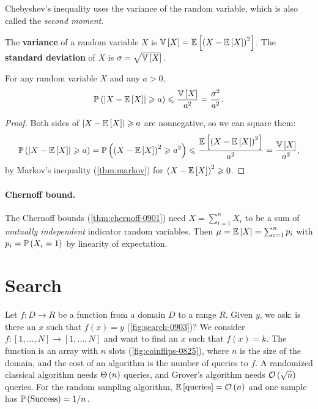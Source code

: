 Chebyshev's inequality uses the variance of the random variable, which is also called the
\emph{second moment}.

\begin{definition}
    The \textbf{variance} of a random variable $X$ is
    $\variance{X} = \expectation{\left(X - \expectation{X}\right)^2}$.
    The \textbf{standard deviation} of $X$ is $\sigma = \sqrt{\operatorname{\mathbb{V}}\left[X\right]}$.
\end{definition}

\begin{theorem}\label{thm:chebyshev}
    For any random variable $X$ and any $a > 0$,
    \[\prob{\abs{X - \expectation{X}} \geq a} \leq \frac{\variance{X}}{a^2} = \frac{\sigma^2}{a^2}.\]
\end{theorem}

\begin{proof}
    Both sides of $\abs{X - \expectation{X}} \geq a$ are nonnegative, so we can square them:
    \[\prob{\abs{X - \expectation{X}} \geq a}
        = \prob{\left(X - \expectation{X}\right)^2 \geq a^2}
        \leq \frac{\expectation{\left(X - \expectation{X}\right)^2}}{a^2}
        = \frac{\variance{X}}{a^2},\]
    by Markov's inequality (\cref{thm:markov}) for $\left(X - \expectation{X}\right)^2 \geq 0$.
\end{proof}

\paragraph{Chernoff bound.}

The Chernoff bounds (\cref{thm:chernoff-0901}) need $X = \sum_{i=1}^{n} X_i$ to be a sum of
\emph{mutually independent} indicator random variables. Then
$\mu = \expectation{X} = \sum_{i=1}^{n} p_i$ with $p_i = \prob{X_i = 1}$ by linearity of
expectation.

\section{Search}

Let $f \colon D \to R$ be a function from a domain $D$ to a range $R$.
Given $y$, we ask: is there an $x$ such that $f(x) = y$ (\cref{fig:search-0903})? We consider
$f \colon [1, \dots, N] \to [1, \dots, N]$ and want to find an $x$ such that $f(x) = k$. The
function is an array with $n$ slots (\cref{fig:coinflips-0825}), where $n$ is the size of the
domain, and the cost of an algorithm is the number of queries to $f$. A randomized classical
algorithm needs $\Theta\left(n\right)$ queries, and Grover's algorithm needs $\mathcal{O}\left(\sqrt{n}\right)$ queries. For
the random sampling algorithm, $\expectation{\text{queries}} = \bigO{n}$ and one sample has
$\prob{\text{Success}} = \sfrac{1}{n}$.

